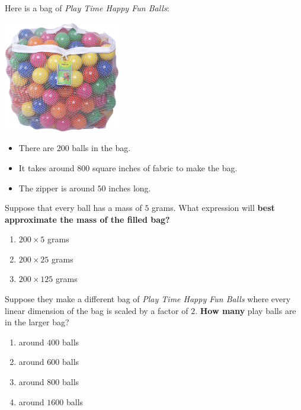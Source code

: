 \documentclass[handout,noauthor,nooutcomes,12pt]{ximera}
\author{Bart Snapp}
\begin{document}
\maketitle


Here is a bag of \textit{Play Time Happy Fun Balls}:
\begin{multicols}{2}
  \begin{center}
    \includegraphics[width=2in]{ballsInBag.jpg}
  \end{center}
  \begin{itemize}
  \item There are $200$ balls in the bag.
  \item It takes around $800$ square inches of fabric to make the bag.
  \item The zipper is around $50$ inches long.
  \end{itemize}
\end{multicols}






\begin{exercise}
  Suppose that every ball has a mass of $5$ grams.  What expression
  will \textbf{best approximate the mass of the filled bag?}
  \begin{multicols}{3}
    \begin{enumerate}
  \item $200\times5$ grams
  \item $200\times25$ grams
  \item $200\times125$ grams
    \end{enumerate}
  \end{multicols}
\end{exercise}



\begin{exercise}
  Suppose they make a different bag of \textit{Play Time Happy Fun
    Balls} where every linear dimension of the bag is scaled by a
  factor of $2$.  \textbf{How many} play balls are in the larger bag?
  \begin{multicols}{3}
    \begin{enumerate}
  \item around $400$ balls
  \item around $600$ balls
  \item around $800$ balls
  \item around $1600$ balls
    \end{enumerate}
  \end{multicols}
\end{exercise}
\end{document}

